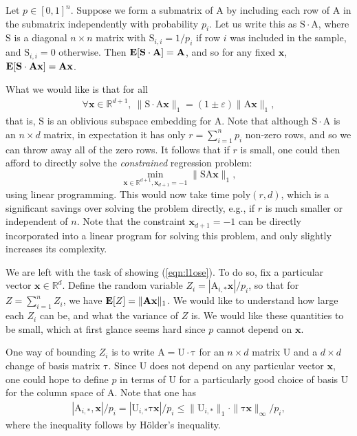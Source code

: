 \documentclass[11pt]{article}
\newcommand{\mat}[1]{{\ensuremath{\bm{\mathrm{#1}}}}}
\def\matA{\mat{A}}
\def\matS{\mat{S}}
\def\matU{\mat{U}}
\def\x{{\mathbf x}}
\newcommand{\eps}{\varepsilon}
\newcommand{\poly}{{\mathrm{poly}}}
\begin{document}
Let $p \in [0,1]^n$. 
Suppose we form a submatrix of $\matA$ by including each row of $\matA$ in the submatrix independently
with probability $p_i$. Let us write this as $\matS \cdot \matA$, where $\matS$ is a diagonal $n \times n$ matrix
with $\matS_{i,i} = 1/p_i$ if row $i$ was included in the sample, and $\matS_{i,i} = 0$ otherwise. Then
${\bf E}[\matS \cdot \matA] = \matA$, and so for any fixed $\x$, ${\bf E}[\matS \cdot \matA \x] = \matA \x$. 

What we would like is that for all 
\begin{eqnarray}\label{eqn:l1ose}
\forall \x \in \mathbb{R}^{d+1}, \ \|\matS \cdot \matA \x\|_1 = (1 \pm \eps) \|\matA \x\|_1,
\end{eqnarray}
that is, 
$\matS$ is an oblivious subspace embedding for $\matA$. Note that although $\matS \cdot \matA$ is an $n \times d$
matrix, in expectation it has only $r = \sum_{i=1}^n p_i$ non-zero rows, and so we can throw away
all of the zero rows. It follows that if $r$ is small,
one could then afford to directly solve the {\it constrained} regression problem:
$$\min_{\x \in \mathbb{R}^{d+1}, \x_{d+1} = -1} \|\matS \matA \x\|_1,$$
using linear programming. This would now take time $\poly(r,d)$, which is a significant savings over
solving the problem directly, e.g., if $r$ is much smaller or independent of $n$. Note that the constraint
$\x_{d+1} = -1$ can be directly incorporated into a linear program for solving this problem, and only
slightly increases its complexity. 

We are left with the task of showing (\ref{eqn:l1ose}). To do so, fix a particular vector
$\x \in \mathbb{R}^d$. Define the random variable $Z_i = |\matA_{i,*} \x|/p_i$, so that for $Z = \sum_{i=1}^n Z_i$,
we have ${\bf E}[Z] = \|\matA \x\|_1$. We would like to understand how large each $Z_i$ can be, and
what the variance of $Z$ is. We would like these quantities to be small, which at first glance
seems hard since $p$ cannot depend on $\x$. 

One way of bounding $Z_i$ is to write $\matA = \matU \cdot \mat\tau$ for an $n \times d$ matrix $\matU$ and
a $d \times d$ change of basis matrix $\mat\tau$. Since $\matU$ does not depend on any particular
vector $\x$, one could hope to define $p$ in terms of $\matU$ for a particularly good choice of basis
$\matU$ for the column space of $\matA$. Note that one has
\begin{eqnarray}\label{eqn:bound}
|\matA_{i,*},\x|/p_i = |\matU_{i,*} \mat\tau \x|/p_i \leq \|\matU_{i,*}\|_1 \cdot \|\mat\tau \x\|_{\infty} / p_i,
\end{eqnarray}
where the inequality follows by H\"older's inequality. 
\end{document}
